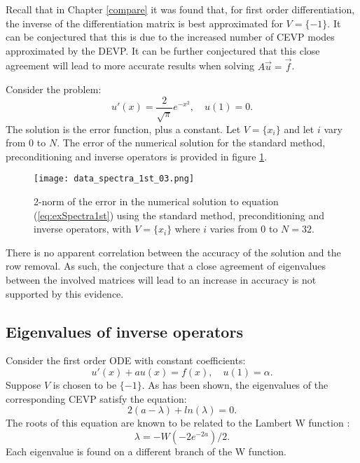 \documentclass{sfuthesis}
\begin{document}
Recall that in Chapter \ref{compare} it was found that, for first order differentiation, the inverse of the differentiation matrix is best approximated for $V = \{ -1 \}$.
It can be conjectured that this is due to the increased number of CEVP modes approximated by the DEVP.
It can be further conjectured that this close agreement will lead to more accurate results when solving $A \vec{u} = \vec{f}$.

Consider the problem:
\begin{equation} \label{eq:exSpectra1st}
u'(x) = \frac{2}{\sqrt{\pi}}e^{-x^2}, \quad u(1) = 0.
\end{equation}
The solution is the error function, plus a constant.
Let $V = \{ x_i \}$ and let $i$ vary from 0 to $N$.
The error of the numerical solution for the standard method, preconditioning and inverse operators is provided in figure \ref{fig:Spectra1st_03}.

\begin{figure}
\texttt{[image: data\_spectra\_1st\_03.png]}
\caption{2-norm of the error in the numerical solution to equation (\ref{eq:exSpectra1st}) using the standard method, preconditioning and inverse operators,
with $V = \{ x_i \}$ where $i$ varies from 0 to $N=32$.}
\label{fig:Spectra1st_03}
\end{figure}

There is no apparent correlation between the accuracy of the solution and the row removal.
As such, the conjecture that a close agreement of eigenvalues between the involved matrices will lead to an increase in accuracy is not supported by this evidence.

\subsection{Eigenvalues of inverse operators}

Consider the first order ODE with constant coefficients:
\begin{equation}
u'(x) + a u(x) = f(x), \quad u(1) = \alpha.
\end{equation}
Suppose $V$ is chosen to be $\{ -1 \}$.
As has been shown, the eigenvalues of the corresponding CEVP satisfy the equation:
\begin{equation}
2 (a - \lambda) + ln(\lambda) = 0.
\end{equation}
The roots of this equation are known to be related to the Lambert W function \cite{Lambert}:
\begin{equation} \label{Lambert}
\lambda = - W \left ( -2 e^{-2a} \right ) / 2.
\end{equation}
Each eigenvalue is found on a different branch of the W function.
\end{document}
